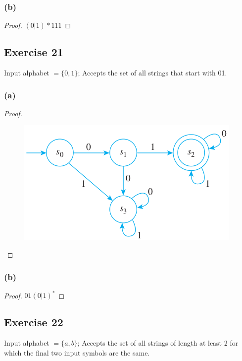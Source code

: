 \documentclass[14pt]{extarticle}
\begin{document}
\subsubsection{(b)}
\begin{proof}
\((0|1)*111\)
\end{proof}

\subsection{Exercise 21}
Input alphabet \(= \{0, 1\}\); Accepts the set of all strings that start with 01.

\subsubsection{(a)}

\begin{proof}
\begin{figure}[ht!]
\centering
\includegraphics[scale=0.5]{../images/12.2.21.a.png}
\end{figure}
\end{proof}

\subsubsection{(b)}

\begin{proof}
\(01(0 | 1)^*\)
\end{proof}

\subsection{Exercise 22}
Input alphabet \(= \{a, b\}\); Accepts the set of all strings of length at least 2 for which the final two input symbols are 
the same.
\end{document}
